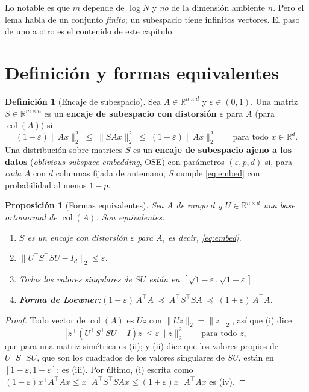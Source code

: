 \documentclass[11pt,a4paper,oneside]{book}
\newtheorem{proposicion}[teorema]{Proposición}
\theoremstyle{definition}
\newtheorem{definicion}[teorema]{Definición}
\theoremstyle{remark}
\newcommand{\R}{\mathbb{R}}
\newcommand{\T}{^{\top}}
\newcommand{\eps}{\varepsilon}
\newcommand{\nrm}[1]{\lVert #1\rVert}
\newcommand{\abs}[1]{\left\lvert #1\right\rvert}
\DeclareMathOperator{\col}{col}
\begin{document}
Lo notable es que $m$ depende de $\log N$ y \emph{no} de la dimensión ambiente $n$. Pero el lema habla de un
conjunto \emph{finito}; un subespacio tiene infinitos vectores. El paso de uno a otro es el contenido de este capítulo.

\section{Definición y formas equivalentes}

\begin{definicion}[Encaje de subespacio]\label{def:embed}
Sea $A\in\R^{n\times d}$ y $\eps\in(0,1)$. Una matriz $S\in\R^{m\times n}$ es un \textbf{encaje de subespacio
con distorsión $\eps$} para $A$ (para $\col(A)$) si
\begin{equation}\label{eq:embed}
  (1-\eps)\nrm{Ax}_2^2\;\le\;\nrm{SAx}_2^2\;\le\;(1+\eps)\nrm{Ax}_2^2\qquad\text{para todo } x\in\R^d .
\end{equation}
Una distribución sobre matrices $S$ es un \textbf{encaje de subespacio ajeno a los datos} (\emph{oblivious
subspace embedding}, OSE) con parámetros $(\eps,p,d)$ si, para \emph{cada} $A$ con $d$ columnas fijada de
antemano, $S$ cumple \eqref{eq:embed} con probabilidad al menos $1-p$.
\end{definicion}

\begin{proposicion}[Formas equivalentes]\label{prop:embed-equiv}
Sea $A$ de rango $d$ y $U\in\R^{n\times d}$ una base ortonormal de $\col(A)$. Son equivalentes:
\begin{enumerate}[label=(\roman*)]
  \item $S$ es un encaje con distorsión $\eps$ para $A$, es decir, \eqref{eq:embed}.
  \item $\nrm{U\T S\T SU-I_d}_2\le\eps$.
  \item Todos los valores singulares de $SU$ están en $[\sqrt{1-\eps},\sqrt{1+\eps}]$.
  \item \textbf{Forma de Loewner:}\quad $(1-\eps)\,A\T A\;\preceq\;A\T S\T SA\;\preceq\;(1+\eps)\,A\T A$.
\end{enumerate}
\end{proposicion}

\begin{proof}
Todo vector de $\col(A)$ es $Uz$ con $\nrm{Uz}_2=\nrm{z}_2$, así que (i) dice
\[ \abs{z\T(U\T S\T SU-I)z}\le\eps\nrm{z}_2^2\qquad\text{para todo }z, \]
que para una matriz simétrica es (ii); y (ii) dice que
los valores propios de $U\T S\T SU$, que son los cuadrados de los valores singulares de $SU$, están en
$[1-\eps,1+\eps]$: es (iii). Por último, (i) escrita como $(1-\eps)x\T A\T Ax\le x\T A\T S\T SAx\le(1+\eps)x\T A\T Ax$ es (iv).
\end{proof}
\end{document}
